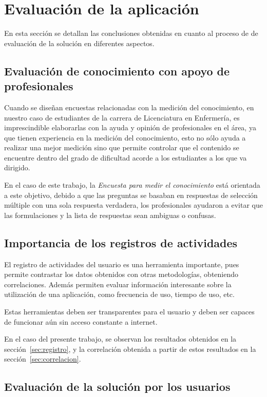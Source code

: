 \section{Evaluación de la aplicación}

En esta sección se detallan las conclusiones obtenidas en cuanto al proceso de
de evaluación de la solución en diferentes aspectos.

\subsection{Evaluación de conocimiento con apoyo de profesionales}

Cuando se diseñan encuestas relacionadas con la medición del conocimiento, en
nuestro caso de estudiantes de la carrera de Licenciatura en Enfermería, es
imprescindible elaborarlas con la ayuda y opinión de profesionales en el área,
ya que tienen experiencia en la medición del conocimiento, esto no sólo ayuda a
realizar una mejor medición sino que permite controlar que el contenido se
encuentre dentro del grado de dificultad acorde a los estudiantes a los que va
dirigido. 

En el caso de este trabajo, la \emph{Encuesta para medir el conocimiento} está orientada a este
objetivo, debido a que las preguntas se basaban en respuestas de selección
múltiple con una sola respuesta verdadera, los profesionales ayudaron a evitar
que las formulaciones y la lista de respuestas sean ambiguas o confusas.


\subsection{Importancia de los registros de actividades}

El registro de actividades del usuario es una herramienta importante, pues
permite contrastar los datos obtenidos con otras metodologías, obteniendo
correlaciones. Además permiten evaluar información interesante sobre la
utilización de una aplicación, como frecuencia de uso, tiempo de uso, etc.

Estas herramientas deben ser transparentes para el usuario y deben ser capaces
de funcionar aún sin acceso constante a internet.

En el caso del presente trabajo, se observan los resultados obtenidos en la
sección~\ref{sec:registro}, y la correlación obtenida a partir de estos
resultados en la sección~\ref{sec:correlacion}.

\subsection{Evaluación de la solución por los usuarios}

